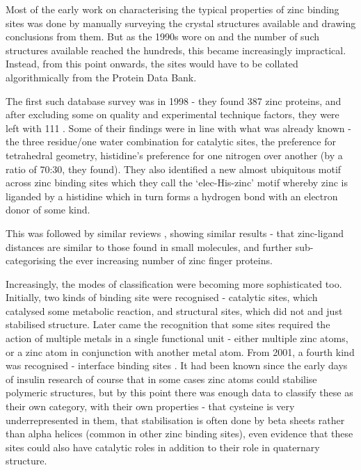 Most of the early work on characterising the typical properties of zinc binding sites was done by manually surveying the crystal structures available and drawing conclusions from them. But as the 1990s wore on and the number of such structures available reached the hundreds, this became increasingly impractical. Instead, from this point onwards, the sites would have to be collated algorithmically from the Protein Data Bank.

The first such database survey was in 1998 - they found 387 zinc proteins, and after excluding some on quality and experimental technique factors, they were left with 111 \cite{alberts1998analysis}. Some of their findings were in line with what was already known - the three residue/one water combination for catalytic sites, the preference for tetrahedral geometry, histidine's preference for one nitrogen over another (by a ratio of 70:30, they found). They also identified a new almost ubiquitous motif across zinc binding sites which they call the `elec-His-zinc' motif whereby zinc is liganded by a histidine which in turn forms a hydrogen bond with an electron donor of some kind.

This was followed by similar reviews \cite{roe1999zinc,laity2001zinc,grishin2001treble,harding2001geometry,krishna2003structural}, showing similar results - that zinc-ligand distances are similar to those found in small molecules, and further sub-categorising the ever increasing number of zinc finger proteins.

Increasingly, the modes of classification were becoming more sophisticated too. Initially, two kinds of binding site were recognised - catalytic sites, which catalysed some metabolic reaction, and structural sites, which did not and just stabilised structure. Later came the recognition that some sites required the action of multiple metals in a single functional unit - either multiple zinc atoms, or a zinc atom in conjunction with another metal atom. From 2001, a fourth kind was recognised - interface binding sites \cite{auld2001zinc}. It had been known since the early days of insulin research of course that in some cases zinc atoms could stabilise polymeric structures, but by this point there was enough data to classify these as their own category, with their own properties - that cysteine is very underrepresented in them, that stabilisation is often done by beta sheets rather than alpha helices (common in other zinc binding sites), even evidence that these sites could also have catalytic roles in addition to their role in quaternary structure.

